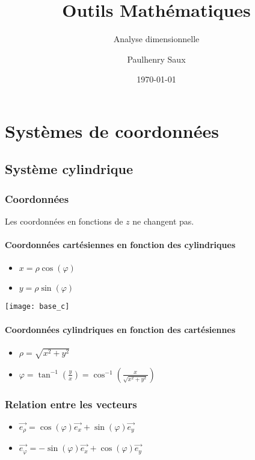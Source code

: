 \documentclass[french]{yLectureNote}
\title{Outils Mathématiques}
\subtitle{Analyse dimensionnelle}
\author{Paulhenry Saux}
\date{\today}
\renewcommand{\vec}{\overrightarrow}
\begin{document}
\setcounter{chapter}{4}
\chapter{Systèmes de coordonnées}
\section{Système cylindrique}
\begin{multicols}{2}

\subsection{Coordonnées}
Les coordonnées en fonctions de $z$ ne changent pas.
\subsubsection{Coordonnées cartésiennes en fonction des cylindriques}
\begin{itemize}
 \item $x = \rho \cos(\varphi)$
 \item $ y = \rho \sin(\varphi)$
\end{itemize}
\columnbreak

\texttt{[image: base\_c]}

\end{multicols}
\subsubsection{Coordonnées cylindriques en fonction des cartésiennes}
\begin{itemize}
 \item $\rho = \sqrt{x^2+y^2}$
 \item $\varphi = \tan^{-1}(\frac{y}{x}) = \cos^{-1}(\frac{x}{\sqrt{x^2+y^2}})$
\end{itemize}

\subsection{Relation entre les vecteurs}
\begin{itemize}
 \item $\vec{e_{\rho}} = \cos( \varphi) \vec{e_x}+\sin( \varphi) \vec{e_y}$
 \item $\vec{e_{\varphi}} = -\sin( \varphi) \vec{e_x}+\cos( \varphi) \vec{e_y}$
\end{itemize}
\end{document}
